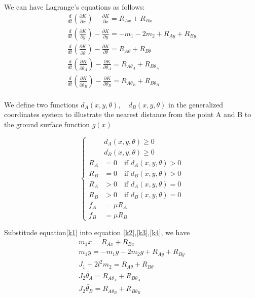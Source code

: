 We can have Lagrange's equations as follows:
\begin{eqnarray}
&\frac{d}{dt}(\frac{\partial K}{\partial \dot{x}})-\frac{\partial K}{\partial x}=R_{Ax}+R_{Bx}& \label{k2} \\
&\frac{d}{dt}(\frac{\partial K}{\partial \dot{y}})-\frac{\partial K}{\partial y}=-m_1-2m_2+R_{Ay}+R_{By}& \label{k3} \\
&\frac{d}{dt}(\frac{\partial K}{\partial \dot{\theta}})-\frac{\partial K}{\partial \theta}=R_{A\theta}+R_{B\theta}& \\ \label{k4}
&\frac{d}{dt}(\frac{\partial K}{\partial \dot{\theta_A}})-\frac{\partial K}{\partial \theta_A}=R_{A\theta_A}+R_{B\theta_A}&\\
&\frac{d}{dt}(\frac{\partial K}{\partial \dot{\theta_B}})-\frac{\partial K}{\partial \theta_B}=R_{A\theta_B}+R_{B\theta_B}&\\
\end{eqnarray}

We define two functions $d_A(x,y,\theta), \quad d_B(x,y,\theta)$ in the generalized coordinates system to illustrate the nearest distance from the point A and B to the ground surface function $g(x)$

\begin{equation}
  \left\{
   \begin{aligned}
   &d_A(x,y,\theta)\ge 0\\
   &d_B(x,y,\theta)\ge0 \\
   R_A&=0 \quad \text{if $d_A(x,y,\theta)>0$}\\
   R_B&=0 \quad \text{if $d_B(x,y,\theta)>0$} \\
   R_A&>0 \quad \text{if $d_A(x,y,\theta)=0$}\\
   R_B&>0 \quad \text{if $d_B(x,y,\theta)=0$}\\
   f_A&=\mu R_A\\
   f_B&=\mu R_B 
   \end{aligned}
  \right.
  \end{equation}

Substitude equation\eqref{k1} into equation \eqref{k2},\eqref{k3},\eqref{k4}, we have 
\begin{eqnarray}
&m_1\ddot{x}=R_{Ax}+R_{Bx}& \\
&m_1\ddot{y}=-m_1g-2m_2g+R_{Ay}+R_{By}&\\
&J_1+2l^2m_2=R_{A\theta}+R_{B\theta}&\\
&J_2\ddot{\theta_A}=R_{A\theta_A}+R_{B\theta_A}&\\
&J_2\ddot{\theta_B}=R_{A\theta_B}+R_{B\theta_B}&
\end{eqnarray}

